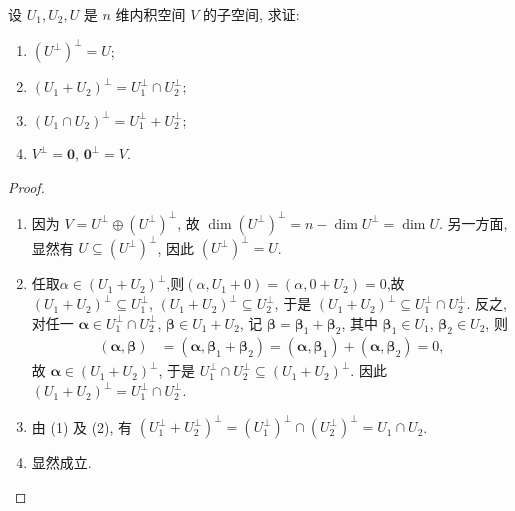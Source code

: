 \documentclass[../../main.tex]{subfiles}
\begin{document}
\begin{proposition}\label{proposition:例9.18}
设 $U_1,U_2,U$ 是 $n$ 维内积空间 $V$ 的子空间, 求证:
\begin{enumerate}[(1)]
\item $(U^\perp)^\perp = U$;
\item $(U_1 + U_2)^\perp = U_1^\perp \cap U_2^\perp$;
\item $(U_1 \cap U_2)^\perp = U_1^\perp + U_2^\perp$;
\item $V^\perp = \boldsymbol{0}$, $\boldsymbol{0}^\perp = V$.
\end{enumerate}
\end{proposition}
\begin{proof}
\begin{enumerate}[(1)]
\item 因为 $V = U^\perp \oplus (U^\perp)^\perp$, 故 $\dim (U^\perp)^\perp = n - \dim U^\perp = \dim U$. 另一方面, 显然有 $U \subseteq (U^\perp)^\perp$, 因此 $(U^\perp)^\perp = U$.
\item 任取$\alpha\in (U_1+U_2)^\perp$,则$(\alpha,U_1+0)=(\alpha,0+U_2)=0 $,故$(U_1 + U_2)^\perp \subseteq U_1^\perp$, $(U_1 + U_2)^\perp \subseteq U_2^\perp$, 于是 $(U_1 + U_2)^\perp \subseteq U_1^\perp \cap U_2^\perp$. 反之, 对任一 $\boldsymbol{\alpha} \in U_1^\perp \cap U_2^\perp$, $\boldsymbol{\beta} \in U_1 + U_2$, 记 $\boldsymbol{\beta} = \boldsymbol{\beta}_1 + \boldsymbol{\beta}_2$, 其中 $\boldsymbol{\beta}_1 \in U_1$, $\boldsymbol{\beta}_2 \in U_2$, 则
\begin{align*}
(\boldsymbol{\alpha},\boldsymbol{\beta}) &= (\boldsymbol{\alpha},\boldsymbol{\beta}_1 + \boldsymbol{\beta}_2) = (\boldsymbol{\alpha},\boldsymbol{\beta}_1) + (\boldsymbol{\alpha},\boldsymbol{\beta}_2) = 0,
\end{align*}
故 $\boldsymbol{\alpha} \in (U_1 + U_2)^\perp$, 于是 $U_1^\perp \cap U_2^\perp \subseteq (U_1 + U_2)^\perp$. 因此 $(U_1 + U_2)^\perp = U_1^\perp \cap U_2^\perp$.
\item 由 (1) 及 (2), 有 $(U_1^\perp + U_2^\perp)^\perp = (U_1^\perp)^\perp \cap (U_2^\perp)^\perp = U_1 \cap U_2$.
\item 显然成立. 
\end{enumerate} 
\end{proof}
\end{document}
